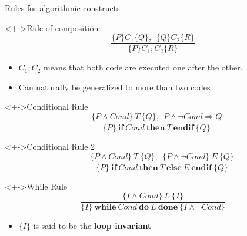 \begin{frame}{Rules for algorithmic constructs}
  \begin{block}<+->{Rule of composition}\vspace{-2\baselineskip}
    $$\frac{\{P\} C_1 \{Q\},~~ \{Q\} C_2 \{R\}}{\{P\} C_1;C_2 \{R\}}$$    
    \begin{itemize}
    \item   $C_1;C_2$ means that both code are executed one after the other.
    \item Can naturally be generalized to more than two codes
    \end{itemize}
  \end{block}

  \begin{block}<+->{Conditional Rule}\vspace{-2\baselineskip}
    $$~~~~\frac{\{P\wedge Cond\} ~T~ \{Q\},~~ P\wedge\neg Cond\Rightarrow Q}{\{P\} \mathbf{~if~} Cond \mathbf{~then~} T \mathbf{~endif~} \{Q\}}$$
  \end{block}

  \begin{block}<+->{Conditional Rule 2}\vspace{-2\baselineskip}
    $$~~~~~~~~~~\frac{\{P\wedge Cond\} ~T~ \{Q\},~~ \{P\wedge\neg Cond\} ~E~
      \{Q\}}{\{P\} \mathbf{~if~} Cond \mathbf{~then~} T \mathbf{~else~} E \mathbf{~endif~} \{Q\}}$$
  \end{block}


  \begin{block}<+->{While Rule}\vspace{-2\baselineskip}
    $$\frac{\{I\wedge Cond\} ~L~ \{I\}}
            {\{I\} \mathbf{~while~} Cond \mathbf{~do~} 
                   L \mathbf{~done~} \{I\wedge\neg Cond\}}$$
    \begin{itemize}\vspace{-.5\baselineskip}
    \item $\{I\}$ is said to be the \alert{\textbf{loop invariant}}
    \end{itemize}
  \end{block}
\end{frame}
